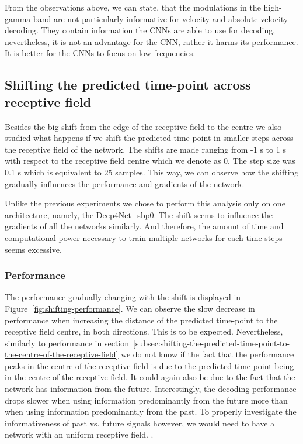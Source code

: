 From the observations above, we can state, that the modulations in the high-gamma band are not particularly informative for velocity and absolute velocity decoding.
They contain information the CNNs are able to use for decoding, nevertheless, it is not an advantage for the CNN, rather it harms its performance.
It is better for the CNNs to focus on low frequencies.


\subsection{Shifting the predicted time-point across receptive field}\label{subsec:shifting-the-predicted-time-point-across-receptive-field}
Besides the big shift from the edge of the receptive field to the centre we also studied what happens if we shift the predicted time-point in smaller steps across the receptive field of the network. 
The shifts are made ranging from  -1 s  to 1 s with respect to the receptive field centre which we denote as 0.
The step size was 0.1 s which is equivalent to 25 samples.
This way, we can observe how the shifting gradually influences the performance and gradients of the network. 

Unlike the previous experiments we chose to perform this analysis only on one architecture, namely, the Deep4Net\_sbp0. 
The shift seems to influence the gradients of all the networks similarly.
And therefore, the amount of time and computational power necessary to train multiple networks for each time-steps seems excessive.  

\subsubsection{Performance}\label{subsubsec:across-shiftig-performace}
The performance gradually changing with the shift is displayed in Figure~\ref{fig:shifting-performance}.
We can observe the slow decrease in performance when increasing the distance of the predicted time-point to the receptive field centre, in both directions. 
This is to be expected. 
Nevertheless, similarly to performance in section~\ref{subsec:shifting-the-predicted-time-point-to-the-centre-of-the-receptive-field} we do not know if the fact that the performance peaks in the centre of the receptive field is due to the predicted time-point being in the centre of the receptive field.
It could again also be due to the fact that the network has information from the future. 
Interestingly, the decoding performance drops slower when using information predominantly from the future more than when using information predominantly from the past.
To properly investigate the informativeness of past vs. future signals however, we would need to have a network with an uniform receptive field. 
.

